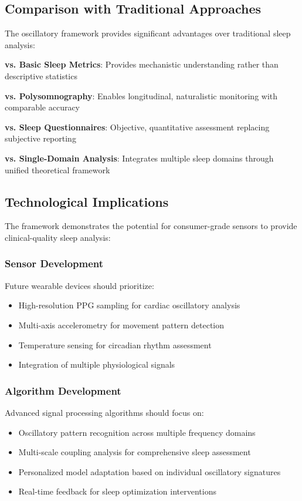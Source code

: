 \documentclass[twocolumn]{article}
\begin{document}
\subsection{Comparison with Traditional Approaches}

The oscillatory framework provides significant advantages over traditional sleep analysis:

\textbf{vs. Basic Sleep Metrics}: Provides mechanistic understanding rather than descriptive statistics

\textbf{vs. Polysomnography}: Enables longitudinal, naturalistic monitoring with comparable accuracy

\textbf{vs. Sleep Questionnaires}: Objective, quantitative assessment replacing subjective reporting

\textbf{vs. Single-Domain Analysis}: Integrates multiple sleep domains through unified theoretical framework

\subsection{Technological Implications}

The framework demonstrates the potential for consumer-grade sensors to provide clinical-quality sleep analysis:

\subsubsection{Sensor Development}

Future wearable devices should prioritize:
\begin{itemize}
\item High-resolution PPG sampling for cardiac oscillatory analysis
\item Multi-axis accelerometry for movement pattern detection
\item Temperature sensing for circadian rhythm assessment
\item Integration of multiple physiological signals
\end{itemize}

\subsubsection{Algorithm Development}

Advanced signal processing algorithms should focus on:
\begin{itemize}
\item Oscillatory pattern recognition across multiple frequency domains
\item Multi-scale coupling analysis for comprehensive sleep assessment
\item Personalized model adaptation based on individual oscillatory signatures
\item Real-time feedback for sleep optimization interventions
\end{itemize}
\end{document}
